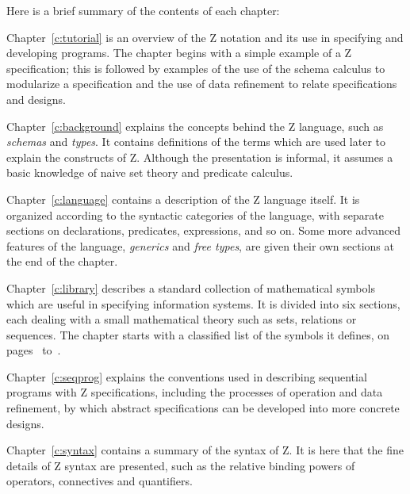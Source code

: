 Here is a brief summary of the contents of each chapter:

Chapter~\ref{c:tutorial} is an overview of the Z notation and its use
in specifying and developing programs. The chapter begins with a
simple example of a Z specification; this is followed by examples of
the use of the schema calculus to modularize a specification and the
use of data refinement to relate specifications and designs.

Chapter~\ref{c:background} explains the concepts behind the Z
language, such as {\em schemas\/} and {\em types}. It contains
definitions of the terms which are used later to explain the
constructs of Z. Although the presentation is informal, it assumes a
basic knowledge of naive set theory and predicate calculus.

Chapter~\ref{c:language} contains a description of the Z language
itself. It is organized according to the syntactic categories of the
language, with separate sections on declarations, predicates,
expressions, and so on.  Some more advanced features of the language,
{\em generics\/} and {\em free types}, are given their own sections at
the end of the chapter.

Chapter~\ref{c:library} describes a standard collection of
mathematical symbols which are useful in specifying information
systems.  It is divided into six sections, each dealing with a small
mathematical theory such as sets, relations or sequences.  The chapter
starts with a classified list of the symbols it defines, on
pages~\pageref{p:symlist+} to~\pageref{p:symlist-}.

Chapter~\ref{c:seqprog} explains the conventions used in describing
sequential programs with Z specifications, including the processes of
operation and data refinement, by which abstract specifications can be
developed into more concrete designs.

Chapter~\ref{c:syntax} contains a summary of the syntax of Z. It is
here that the fine details of Z syntax are presented, such as the
relative binding powers of operators, connectives and quantifiers.

